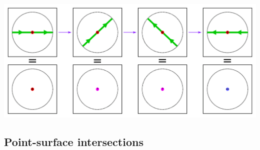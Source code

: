 \documentclass{book}
\begin{document}
\begin{center}
\includegraphics[width = \textwidth]{Intersections/Undefined_intersections/point_path_intersection_contradiction_2}
\end{center}




\subsection{Point-surface intersections}
\end{document}
